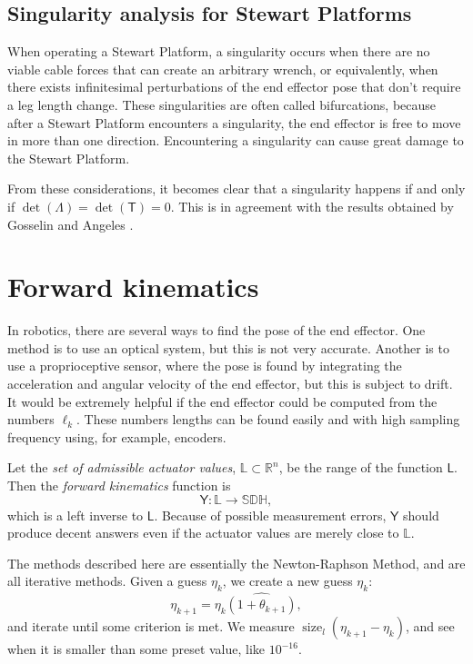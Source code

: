 \documentclass[reqno,12pt]{amsart}
\newcommand\setunitdualquat{\mathbb S\mathbb D\mathbb H}
\DeclareMathOperator\size{{size}}
\begin{document}
\subsection{Singularity analysis for Stewart Platforms}

When operating a Stewart Platform, a singularity occurs when there are no viable cable forces that can create an arbitrary wrench, or equivalently, when there exists infinitesimal perturbations of the end effector pose that don't require a leg length change.  These singularities are often called bifurcations, because after a Stewart Platform encounters a singularity, the end effector is free to move in more than one direction.  Encountering a singularity can cause great damage to the Stewart Platform.

From these considerations, it becomes clear that a singularity happens if and only if $\det(\mathsf \Lambda) = \det(\mathsf T) = 0$.  This is in agreement with the results obtained by Gosselin and Angeles \cite{gosselin-angeles}.

\section{Forward kinematics}
\label{sec forward kinematics}

In robotics, there are several ways to find the pose of the end effector.  One method is to use an optical system, but this is not very accurate.  Another is to use a proprioceptive sensor, where the pose is found by integrating the acceleration and angular velocity of the end effector, but this is subject to drift.  It would be extremely helpful if the end effector could be computed from the numbers $\ell_k$.  These numbers lengths can be found easily and with high sampling frequency using, for example, encoders.

Let the \emph{set of admissible actuator values}, $\mathbb L \subset \mathbb R^n$, be the range of the function $\mathsf L$.  Then the \emph{forward kinematics} function is
\begin{equation}
\mathsf Y : \mathbb L \to \setunitdualquat,
\end{equation}
 which is a left inverse to $\mathsf L$.  Because of possible measurement errors, $\mathsf Y$ should produce decent answers even if the actuator values are merely close to $\mathbb L$.

The methods described here are essentially the Newton-Raphson Method, and are all iterative methods.  Given a guess $\eta_k$, we create a new guess $\eta_k$:
\begin{equation}
\eta_{k+1} = \eta_k \widehat{(1 + \theta_{k+1})},
\end{equation}
and iterate until some criterion is met.  We measure $\size_l(\eta_{k+1} - \eta_k)$, and see when it is smaller than some preset value, like $10^{-16}$.
\end{document}
